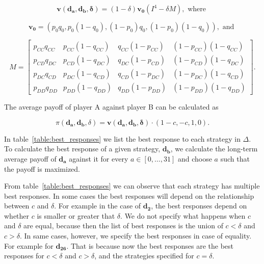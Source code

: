 \documentclass[11pt]{article}
\begin{document}
\begin{equation*}
    \mathbf{v(\mathbf{d_{a}}, \mathbf{d_{b}}, \delta)} = (1 - \delta) \mathbf{v_{0}} \left(I^4 - \delta M \right), \text{ where }
\end{equation*}

\begin{equation*}
    \mathbf{v_{0}} = \left(p_{0}q_{0}, p_{0}(1 - q_{0}), (1 - p_{0})q_{0}, (1 - p_{0})(1 - q_{0}) \right), \text{ and }
\end{equation*}

\begin{equation}
    \displaystyle M = \left[\begin{matrix}p_{CC} q_{CC} & p_{CC} \left(1 - q_{CC}\right) & q_{CC} \left(1 - p_{CC}\right) & \left(1 - p_{CC}\right) \left(1 - q_{CC}\right)\\
      p_{CD} q_{DC} & p_{CD} \left(1 - q_{DC}\right) & q_{DC} \left(1 - p_{CD}\right) & \left(1 - p_{CD}\right) \left(1 - q_{DC}\right)\\
      p_{DC} q_{CD} & p_{DC} \left(1 - q_{CD}\right) & q_{CD} \left(1 - p_{DC}\right) & \left(1 - p_{DC}\right) \left(1 - q_{CD}\right)\\
      p_{DD} q_{DD} & p_{DD} \left(1 - q_{DD}\right) & q_{DD} \left(1 - p_{DD}\right) & \left(1 - p_{DD}\right) \left(1 - q_{DD}\right)\end{matrix}\right].
\end{equation}

The average payoff of player A against player B can be calculated as

\begin{equation*}
    \pi(\mathbf{d_{a}}, \mathbf{d_{b}}, \delta) = \mathbf{v(\mathbf{d_{a}}, \mathbf{d_{b}}, \delta)} \cdot (1 - c, -c, 1, 0).
\end{equation*}

In table~\ref{table:best_responses} we list the best response to each strategy
in \(\Delta\). To calculate the best response of a given strategy,
\(\mathbf{d_{b}}\), we calculate the long-term average payoff of
\(\mathbf{d_{a}}\) against it for every \(a \in [0, \dots, 31]\) and choose
\(a\) such that the payoff is maximized.

From table~\ref{table:best_responses} we can observe that each strategy has
multiple best responses. In some cases the best responses will depend on the
relationship between \(c\) and \(\delta\). For example in the case of
\(\mathbf{d_{2}}\), the best responses depend on whether \(c\) is
smaller or greater that \(\delta\). We do not specify what happens when \(c\)
and \(\delta\) are equal, because then the list of best responses is the union
of \(c < \delta\) and \(c > \delta\). In same cases, however, we specify the
best responses in case of equality. For example
for \(\mathbf{d_{26}}\). That is because now the best responses are the best
responses for \(c < \delta\) and \(c > \delta\), and the strategies specified
for \(c = \delta\).
\end{document}
